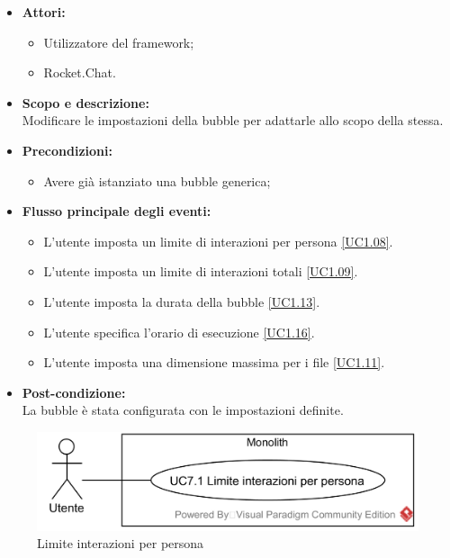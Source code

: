 \begin{itemize}
	\item \textbf{Attori:}
	\begin{itemize}
		\item Utilizzatore del framework;
		\item Rocket.Chat.
	\end{itemize}
	\item \textbf{Scopo e descrizione:} 
	\\Modificare le impostazioni della bubble per adattarle allo scopo della stessa.
	\item \textbf{Precondizioni:}
	\begin{itemize}
		\item Avere già istanziato una bubble generica;
	\end{itemize}
	\item \textbf{Flusso principale degli eventi:}
	\begin{itemize}
		\item L'utente imposta un limite di interazioni per persona \ref{UC1.08}.
		\item L'utente imposta un limite di interazioni totali \ref{UC1.09}.
		\item L'utente imposta la durata della bubble \ref{UC1.13}.
		\item L'utente specifica l'orario di esecuzione \ref{UC1.16}.
		\item L'utente imposta una dimensione massima per i file \ref{UC1.11}.
	\end{itemize}
	\item \textbf{Post-condizione:}
	\\La bubble è stata configurata con le impostazioni definite.
\end{itemize}

\begin{samepage}
\nopagebreak
\begin{figure}[H]
	\centering
	\includegraphics[width=15cm]{../../documenti/AnalisiDeiRequisiti/Diagrammi_img/usecase/uc1_08.png}
	\caption{\UCFCaption{} Limite interazioni per persona}
\end{figure}
\end{samepage}

